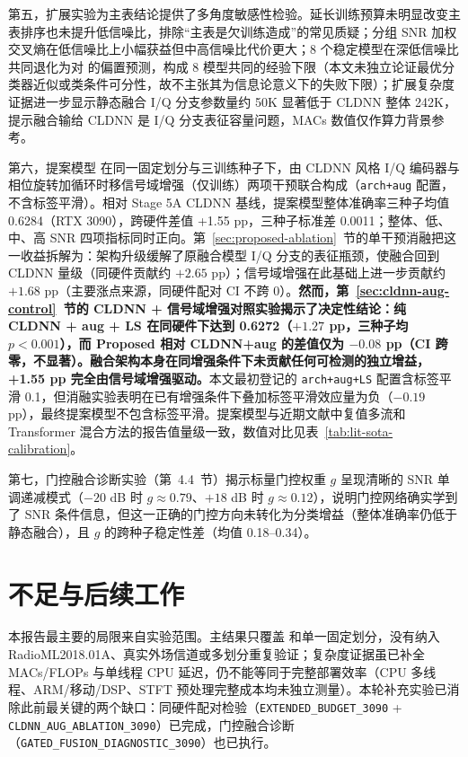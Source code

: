 第五，扩展实验为主表结论提供了多角度敏感性检验。延长训练预算未明显改变主表排序也未提升低信噪比，排除“主表是欠训练造成”的常见质疑；分组 SNR 加权交叉熵在低信噪比上小幅获益但中高信噪比代价更大；8 个稳定模型在深低信噪比共同退化为对  的偏置预测，构成 8 模型共同的经验下限（本文未独立论证最优分类器近似或类条件可分性，故不主张其为信息论意义下的失败下限）；扩展复杂度证据进一步显示静态融合 I/Q 分支参数量约 50K 显著低于 CLDNN 整体 242K，提示融合输给 CLDNN 是 I/Q 分支表征容量问题，MACs 数值仅作算力背景参考。

第六，提案模型  在同一固定划分与三训练种子下，由 CLDNN 风格 I/Q 编码器\cite{sainath2015cldnn,hochreiter1997lstm}与相位旋转加循环时移信号域增强（仅训练）\cite{huang2022mixingsignals,shorten2019dataaug}两项干预联合构成（\texttt{arch+aug} 配置，不含标签平滑）。相对 Stage 5A CLDNN 基线，提案模型整体准确率三种子均值 0.6284（RTX 3090），跨硬件差值 +1.55 pp，三种子标准差 0.0011；整体、低、中、高 SNR 四项指标同时正向。第~\ref{sec:proposed-ablation}~节的单干预消融把这一收益拆解为：架构升级缓解了原融合模型 I/Q 分支的表征瓶颈，使融合回到 CLDNN 量级（同硬件贡献约 $+2.65$ pp）；信号域增强在此基础上进一步贡献约 \(+1.68\) pp（主要涨点来源，同硬件配对 CI 不跨 0）。\textbf{然而，第~\ref{sec:cldnn-aug-control}~节的 CLDNN + 信号域增强对照实验揭示了决定性结论：纯 CLDNN + aug + LS 在同硬件下达到 0.6272（$+1.27$ pp，三种子均 $p < 0.001$），而 Proposed 相对 CLDNN+aug 的差值仅为 $-0.08$ pp（CI 跨零，不显著）。融合架构本身在同增强条件下未贡献任何可检测的独立增益，+1.55 pp 完全由信号域增强驱动。}本文最初登记的 \texttt{arch+aug+LS} 配置含标签平滑 0.1，但消融实验表明在已有增强条件下叠加标签平滑效应量为负（$-0.19$ pp），最终提案模型不包含标签平滑。提案模型与近期文献中复值多流\cite{wang2024ccmsnet}和 Transformer 混合方法\cite{cao2024sigformer,liu2024lenetm,li2024icrnna}的报告值量级一致，数值对比见表~\ref{tab:lit-sota-calibration}。

第七，门控融合诊断实验（第~4.4~节）揭示标量门控权重 $g$ 呈现清晰的 SNR 单调递减模式（$-20$ dB 时 $g \approx 0.79$、$+18$ dB 时 $g \approx 0.12$），说明门控网络确实学到了 SNR 条件信息，但这一正确的门控方向未转化为分类增益（整体准确率仍低于静态融合），且 $g$ 的跨种子稳定性差（均值 0.18--0.34）。

\section{不足与后续工作}

本报告最主要的局限来自实验范围。主结果只覆盖 \datasetname{} 和单一固定划分，没有纳入 RadioML2018.01A、真实外场信道或多划分重复验证；复杂度证据虽已补全 MACs/FLOPs 与单线程 CPU 延迟，仍不能等同于完整部署效率（CPU 多线程、ARM/移动/DSP、STFT 预处理完整成本均未独立测量）。本轮补充实验已消除此前最关键的两个缺口：同硬件配对检验（\texttt{EXTENDED\_BUDGET\_3090} + \texttt{CLDNN\_AUG\_ABLATION\_3090}）已完成，门控融合诊断（\texttt{GATED\_FUSION\_DIAGNOSTIC\_3090}）也已执行。

